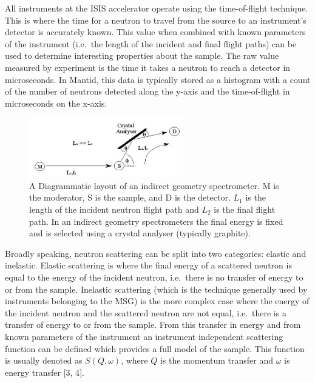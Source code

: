 \documentclass[paper=a4, fontsize=11pt]{scrartcl}	%
\numberwithin{equation}{section}															%
\numberwithin{figure}{section}																%
\numberwithin{table}{section}
\begin{document}
All instruments at the ISIS accelerator operate using the time-of-flight
technique. This is where the time for a neutron to travel from the
source to an instrument's detector is accurately known. This value when
combined with known parameters of the instrument (i.e.~the length of the
incident and final flight paths) can be used to determine interesting
properties about the sample. The raw value measured by experiment is the
time it takes a neutron to reach a detector in microseconds. In Mantid,
this data is typically stored as a histogram with a count of the number
of neutrons detected along the y-axis and the time-of-flight in
microseconds on the x-axis.

\begin{figure}[H]
\centering
\includegraphics[width=0.6\textwidth]{img/instrument-diagram.png}
\caption{A Diagrammatic layout of an indirect geometry spectrometer. M is the moderator, S is the sample, and D is the detector. $L_1$ is the length of the incident neutron flight path and $L_2$ is the final flight path. In an indirect geometry spectrometers the final energy is fixed and is selected using a crystal analyser (typically graphite).}
\label{fig:instrument-diagram}
\end{figure}

Broadly speaking, neutron scattering can be split into two categories:
elastic and inelastic. Elastic scattering is where the final energy of a
scattered neutron is equal to the energy of the incident neutron,
i.e.~there is no transfer of energy to or from the sample. Inelastic
scattering (which is the technique generally used by instruments
belonging to the MSG) is the more complex case where the energy of the
incident neutron and the scattered neutron are not equal, i.e.~there is
a transfer of energy to or from the sample. From this transfer in energy
and from known parameters of the instrument an instrument independent
scattering function can be defined which provides a full model of the
sample. This function is usually denoted as $S(Q,\omega)$, where $Q$ is
the momentum transfer and $\omega$ is energy transfer {[}3, 4{]}.
\end{document}
